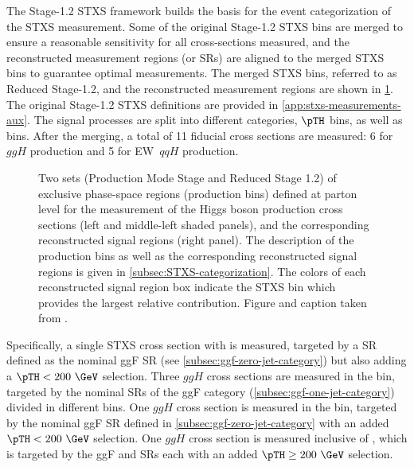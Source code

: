 The Stage-1.2 STXS framework builds the basis for the event categorization of the STXS measurement. 
Some of the original Stage-1.2 STXS bins are merged to ensure a reasonable sensitivity for all cross-sections measured, and the reconstructed measurement regions (or SRs) are aligned to the merged STXS bins to guarantee optimal measurements. 
The merged STXS bins, referred to as Reduced Stage-1.2, and the reconstructed measurement regions are shown in \cref{fig:STXS_Diagram}. 
The original Stage-1.2 STXS definitions are provided in \cref{app:stxs-measurements-aux}. 
The signal processes are split into different \Njets categories, $\pTH$ bins, as well as \mjj bins. 
After the merging, a total of 11 fiducial cross sections are measured: 6 for $ggH$ production and 5 for EW~$qqH$ production.
\begin{figure}[t]
    \caption{Two sets (Production Mode Stage and Reduced Stage 1.2) of exclusive phase-space regions (production bins) defined at parton level for the measurement of the Higgs boson production cross sections (left and middle-left shaded panels), and the corresponding reconstructed signal regions (right panel). The description of the production bins as well as the corresponding reconstructed signal regions is given in \cref{subsec:STXS-categorization}. The colors of each reconstructed signal region box indicate the STXS bin which provides the largest relative contribution.
    Figure and caption taken from .
    \label{fig:STXS_Diagram}
    }
\end{figure}
Specifically, a single STXS cross section with \ZeroJet is measured, targeted by a SR defined as the nominal ggF \ZeroJet SR (see \cref{subsec:ggf-zero-jet-category}) but also adding a $\pTH < 200~\GeV$ selection.
Three $ggH$ cross sections are measured in the \OneJet bin, targeted by the nominal SRs of the ggF \OneJet category (\cref{subsec:ggf-one-jet-category}) divided in different \pTH bins.
One $ggH$ cross section is measured in the \TwoJet bin, targeted by the nominal ggF \TwoJet SR defined in \cref{subsec:ggf-zero-jet-category} with an added $\pTH < 200~\GeV$ selection.
One $ggH$ cross section is measured inclusive of \Njets, which is targeted by the ggF \TwoJet and \OneJet SRs each with an added $\pTH \geq 200~\GeV$ selection.
